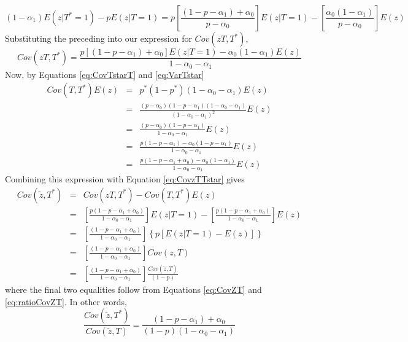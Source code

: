 \begin{equation*}
  (1-\alpha_1)E(z|T^*=1) - pE(z|T=1) = p\left[ \frac{\left( 1 -p-\alpha_1 \right) + \alpha_0}{p - \alpha_0} \right]E(z|T=1) - \left[ \frac{\alpha_0(1-\alpha_1)}{p - \alpha_0} \right] E(z)
\end{equation*}
Substituting the preceding into our expression for $Cov(zT,T^*)$,
\begin{equation}
  Cov(zT,T^*) = \frac{p\left[ \left( 1 - p - \alpha_1 \right) + \alpha_0 \right]E(z|T=1) - \alpha_0(1-\alpha_1)E(z)}{1 - \alpha_0 - \alpha_1} 
  \label{eq:CovzTTstar}
\end{equation}
Now, by Equations \ref{eq:CovTstarT} and \ref{eq:VarTstar}
\begin{eqnarray*}
  Cov(T,T^*)E(z) &=& p^*(1-p^*)(1-\alpha_0 -\alpha_1)E(z) \\
  &=& \frac{(p -\alpha_0)(1-p-\alpha_1)\left( 1 - \alpha_0 - \alpha_1 \right)}{(1 - \alpha_0 - \alpha_1)^2}E(z)\\
  &=& \frac{(p -\alpha_0)(1-p-\alpha_1)}{1 - \alpha_0 - \alpha_1}E(z)\\
  &=& \frac{p(1 - p - \alpha_1) - \alpha_0\left( 1 - p -\alpha_1 \right)}{1 - \alpha_0 - \alpha_1}E(z)\\
  &=& \frac{p(1 - p - \alpha_1 + \alpha_0) - \alpha_0\left( 1  -\alpha_1 \right)}{1 - \alpha_0 - \alpha_1}E(z)
\end{eqnarray*}
Combining this expression with Equation \ref{eq:CovzTTstar} gives 
\begin{eqnarray*}
  Cov(\widetilde{z},T^*) &=& Cov(zT,T^*) - Cov(T,T^*)E(z)\\
  &=& \left[ \frac{p \left( 1 - p - \alpha_1 + \alpha_0 \right) }{1 - \alpha_0 - \alpha_1} \right]E(z|T=1) - \left[ \frac{p(1 - p - \alpha_1 + \alpha_0)}{1 - \alpha_0 - \alpha_1} \right]E(z)\\
  &=& \left[ \frac{ \left( 1 - p - \alpha_1 + \alpha_0 \right) }{1 - \alpha_0 - \alpha_1} \right]\left\{p\left[E(z|T=1) - E(z)\right]\right\}\\
  &=& \left[ \frac{ \left( 1 - p - \alpha_1 + \alpha_0 \right) }{1 - \alpha_0 - \alpha_1} \right]Cov(z,T)\\
  &=& \left[ \frac{ \left( 1 - p - \alpha_1 + \alpha_0 \right) }{1 - \alpha_0 - \alpha_1} \right]\frac{Cov(\widetilde{z},T)}{(1-p)}
\end{eqnarray*}
where the final two equalities follow from Equations \ref{eq:CovZT} and \ref{eq:ratioCovZT}.
In other words,
\begin{equation}
  \frac{Cov(\widetilde{z},T^*)}{Cov(\widetilde{z},T)} = \frac{(1- p - \alpha_1) + \alpha_0}{(1-p)(1 - \alpha_0 - \alpha_1)}
\end{equation}

